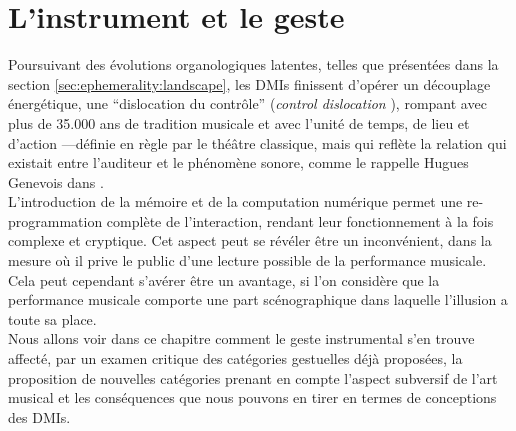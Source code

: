 %
\chapter{L'instrument et le geste}
\label{ch:gesture}



\vspace*{\fill}

\noindent Poursuivant des évolutions organologiques latentes, telles que présentées dans la section \ref{sec:ephemerality:landscape}, les \glspl{DMI} finissent d'opérer un découplage énergétique, une ``dislocation du contrôle'' (\textit{control dislocation} \cite{miranda_new_2006}), rompant avec plus de 35.000 ans de tradition musicale \cite{conard_new_2009} et avec l'unité de temps, de lieu et d'action —définie en règle par le théâtre classique, mais qui reflète la relation qui existait entre l'auditeur et le phénomène sonore, comme le rappelle Hugues Genevois dans \cite{cance_what_2012}.\\
\indent L'introduction de la mémoire et de la computation numérique permet une re-programmation complète de l'interaction, rendant leur fonctionnement à la fois complexe et cryptique. Cet aspect peut se révéler être un inconvénient, dans la mesure où il prive le public d’une lecture possible de la performance musicale. Cela peut cependant s’avérer être un avantage, si l'on considère que la performance musicale comporte une part scénographique dans laquelle l’illusion a toute sa place.\\
\indent Nous allons voir dans ce chapitre comment le geste instrumental s'en trouve affecté, par un examen critique des catégories gestuelles déjà proposées, la proposition de nouvelles catégories prenant en compte l'aspect subversif de l'art musical et les conséquences que nous pouvons en tirer en termes de conceptions des \glspl{DMI}.

